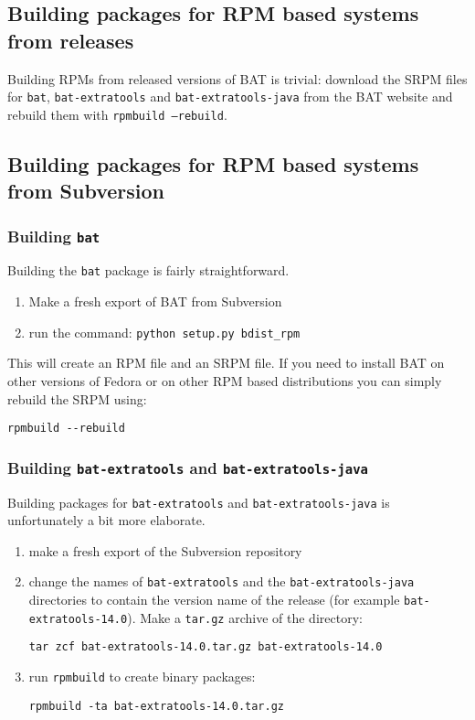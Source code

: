 \documentclass[10pt,a4paper]{article}
\begin{document}
\subsection{Building packages for RPM based systems from releases}

Building RPMs from released versions of BAT is trivial: download the SRPM
files for \texttt{bat}, \texttt{bat-extratools} and
\texttt{bat-extratools-java} from the BAT website and rebuild them with
\texttt{rpmbuild --rebuild}.

\subsection{Building packages for RPM based systems from Subversion}

\subsubsection{Building \texttt{bat}}

Building the \texttt{bat} package is fairly straightforward.

\begin{enumerate}
\item Make a fresh export of BAT from Subversion
\item run the command: \texttt{python setup.py bdist\_rpm}
\end{enumerate}

This will create an RPM file and an SRPM file. If you need to install BAT on
other versions of Fedora or on other RPM based distributions you can simply
rebuild the SRPM using:

\begin{verbatim}
rpmbuild --rebuild
\end{verbatim}

\subsubsection{Building \texttt{bat-extratools} and
\texttt{bat-extratools-java}}

Building packages for \texttt{bat-extratools} and \texttt{bat-extratools-java}
is unfortunately a bit more elaborate.

\begin{enumerate}
\item make a fresh export of the Subversion repository
\item change the names of \texttt{bat-extratools} and the
\texttt{bat-extratools-java} directories to contain the version name of the
release (for example \texttt{bat-extratools-14.0}). Make a \texttt{tar.gz}
archive of the directory:

\begin{verbatim}
tar zcf bat-extratools-14.0.tar.gz bat-extratools-14.0
\end{verbatim}

\item run \texttt{rpmbuild} to create binary packages:

\begin{verbatim}
rpmbuild -ta bat-extratools-14.0.tar.gz
\end{verbatim}
\end{enumerate}
\end{document}
